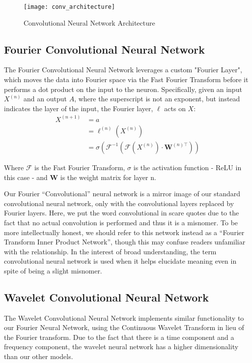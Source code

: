 \begin{figure}[ht]
\caption{Convolutional Neural Network Architecture}
\label{fig:conv net}
\texttt{[image: conv\_architecture]}
\centering
\end{figure}

\subsection{Fourier Convolutional Neural Network}
The Fourier Convolutional Neural Network leverages a custom "Fourier Layer", which moves the data into Fourier space via the Fast Fourier Transform before it performs a dot product on the input to the neuron.
Specifically, given an input $X^{(n)}$ and an output $A$, where the superscript is not an exponent, but instead indicates the layer of the input, the Fourier layer, $\ell$ acts on $X$:
\begin{align*}
X^{(n+1)} & = a \\
& = \ell^{(n)}(X^{(n)}) \\
& = \sigma(\mathcal{F}^{-1}(\mathcal{F}(X^{(n)})\cdot \mathbf{W}^{(n)\top}))
\end{align*}

Where $\mathcal{F}$ is the Fast Fourier Transform, $\sigma$ is the activation function - ReLU in this case - and $\mathbf{W}$ is the weight matrix for layer n.

Our Fourier ``Convolutional'' neural network is a mirror image of our standard convolutional neural network, only with the convolutional layers replaced by Fourier layers.
Here, we put the word convolutional in scare quotes due to the fact that no actual convolution is performed and thus it is a misnomer.
To be more intellectually honest, we should refer to this network instead as a ``Fourier Transform Inner Product Network'', though this may confuse readers unfamiliar with the relationship.
In the interest of broad understanding, the term convolutional neural network is used when it helps elucidate meaning even in spite of being a slight misnomer.

\subsection{Wavelet Convolutional Neural Network} \label{wavelet cnn}
The Wavelet Convolutional Neural Network implements similar functionality to our Fourier Neural Network, using the Continuous Wavelet Transform in lieu of the Fourier transform.
Due to the fact that there is a time component and a frequency component, the wavelet neural network has a higher dimensionality than our other models.

